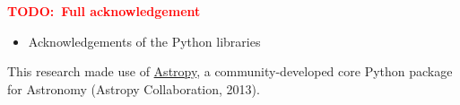 \documentclass[preprint]{aastex}
\newcommand{\todo}[1]{\textcolor{red}{\textbf{TODO:~#1}}}
\begin{document}
  \todo{Full acknowledgement}\\
  \begin{itemize}
      \item Acknowledgements of the Python libraries
  \end{itemize}

  This research made use of 
  \href{http://www.astropy.org/}{Astropy}, a community-developed 
        core Python package for Astronomy (Astropy Collaboration, 2013). 











%

\label{lastpage}
\end{document}
